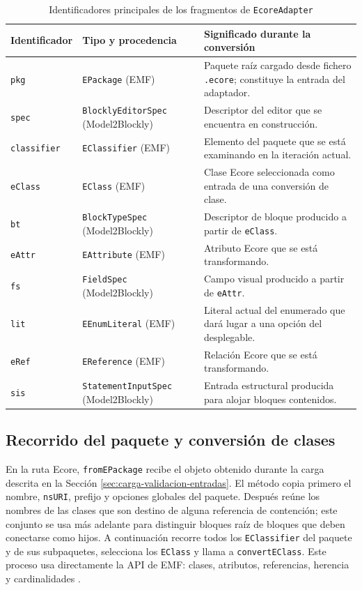 \begin{table}[H]
  \centering
  \small
  \begin{tabular}{|L{0.16\textwidth}|L{0.30\textwidth}|L{0.42\textwidth}|}
    \hline
    Identificador & Tipo y procedencia & Significado durante la conversión \\
    \hline
    \texttt{pkg} & \texttt{EPackage} (EMF) & Paquete raíz cargado desde
    fichero \texttt{.ecore}; constituye la entrada del adaptador. \\
    \texttt{spec} & \texttt{BlocklyEditorSpec} (Model2Blockly) & Descriptor del
    editor que se encuentra en construcción. \\
    \texttt{classifier} & \texttt{EClassifier} (EMF) & Elemento del paquete que
    se está examinando en la iteración actual. \\
    \texttt{eClass} & \texttt{EClass} (EMF) & Clase Ecore seleccionada como
    entrada de una conversión de clase. \\
    \texttt{bt} & \texttt{BlockTypeSpec} (Model2Blockly) & Descriptor de bloque
    producido a partir de \texttt{eClass}. \\
    \texttt{eAttr} & \texttt{EAttribute} (EMF) & Atributo Ecore que se está
    transformando. \\
    \texttt{fs} & \texttt{FieldSpec} (Model2Blockly) & Campo visual producido a
    partir de \texttt{eAttr}. \\
    \texttt{lit} & \texttt{EEnumLiteral} (EMF) & Literal actual del enumerado que
    dará lugar a una opción del desplegable. \\
    \texttt{eRef} & \texttt{EReference} (EMF) & Relación Ecore que se está
    transformando. \\
    \texttt{sis} & \texttt{StatementInputSpec} (Model2Blockly) & Entrada
    estructural producida para alojar bloques contenidos. \\
    \hline
  \end{tabular}
  \caption{Identificadores principales de los fragmentos de \texttt{EcoreAdapter}}
  \label{tab:identificadores-adaptador-ecore}
\end{table}

\subsection{Recorrido del paquete y conversión de clases}

En la ruta Ecore, \texttt{fromEPackage} recibe el objeto obtenido durante la
carga descrita en la Sección \ref{sec:carga-validacion-entradas}. El método copia
primero el nombre, \texttt{nsURI}, prefijo y opciones globales del paquete.
Después reúne los nombres de las clases que son destino de alguna referencia de
contención; este conjunto se usa más adelante para distinguir bloques raíz de
bloques que deben conectarse como hijos. A continuación recorre todos los
\texttt{EClassifier} del paquete y de sus subpaquetes, selecciona los
\texttt{EClass} y llama a \texttt{convertEClass}. Este proceso usa directamente
la API de EMF: clases, atributos, referencias, herencia y cardinalidades
\cite{emfOverview}.

